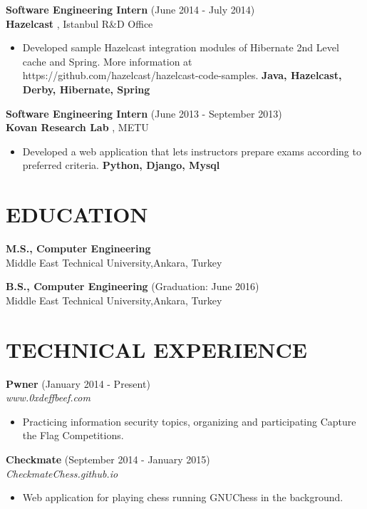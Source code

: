 \documentclass[margin, 10pt]{res} %
\begin{document}
\begin{resume}
{\bf Software Engineering Intern} \hfill (June 2014 - July 2014) \\
{\bf Hazelcast }, Istanbul R\&D Office
\begin{itemize} 
\item Developed sample Hazelcast integration modules of Hibernate 2nd Level cache and Spring. More information at https://github.com/hazelcast/hazelcast-code-samples. {\bf Java, Hazelcast, Derby, Hibernate, Spring }
\end{itemize} 

{\bf Software Engineering Intern} \hfill (June 2013 - September 2013) \\
{\bf Kovan Research Lab }, METU
\begin{itemize}
\item Developed a web application that lets instructors prepare exams according to preferred criteria. {\bf Python, Django, Mysql }
\end{itemize} 





\section{EDUCATION}

{\bf M.S., Computer Engineering } \\
Middle East Technical University,Ankara, Turkey

{\bf B.S., Computer Engineering } \hfill {(Graduation: June 2016)}\\
Middle East Technical University,Ankara, Turkey


\section{TECHNICAL EXPERIENCE}

{\bf Pwner} \hfill (January 2014 - Present) \\
\textit{www.0xdeffbeef.com}
\begin{itemize} 
\item Practicing information security topics, organizing and participating Capture the Flag Competitions. 
\end{itemize} 

{\bf Checkmate} \hfill (September 2014 - January 2015) \\
\textit{CheckmateChess.github.io}
\begin{itemize} 
\item Web application for playing chess running GNUChess in the background.
\end{itemize} 


\end{resume}
\end{document}
